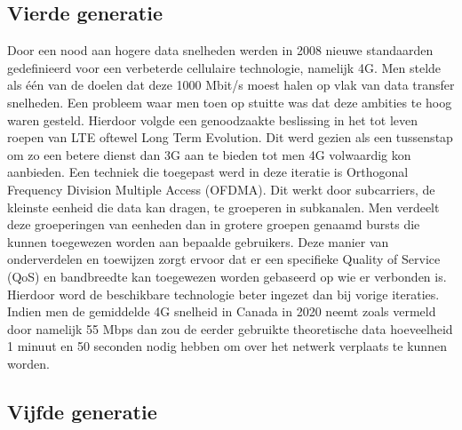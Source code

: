 \subsection{Vierde generatie}

Door een nood aan hogere data snelheden werden in 2008 nieuwe standaarden gedefinieerd voor een verbeterde cellulaire technologie, namelijk 4G. Men stelde als één van de doelen dat deze 1000 Mbit/s moest halen op vlak van data transfer snelheden. Een probleem waar men toen op stuitte was dat deze ambities te hoog waren gesteld. Hierdoor volgde een genoodzaakte beslissing in het tot leven roepen van LTE oftewel Long Term Evolution. Dit werd gezien als een tussenstap om zo een betere dienst dan 3G aan te bieden tot men 4G volwaardig kon aanbieden. \autocite{Nicholls2022} Een techniek die toegepast werd in deze iteratie is Orthogonal Frequency Division Multiple Access (OFDMA). Dit werkt door subcarriers, de kleinste eenheid die data kan dragen,  te groeperen in subkanalen. Men verdeelt deze groeperingen van eenheden dan in grotere groepen genaamd bursts die kunnen toegewezen worden aan bepaalde gebruikers. Deze manier van onderverdelen en toewijzen zorgt ervoor dat er een specifieke Quality of Service (QoS) en bandbreedte kan toegewezen worden gebaseerd op wie er verbonden is. Hierdoor word de beschikbare technologie beter ingezet dan bij vorige iteraties. \autocite{Friedmann2007} Indien men de gemiddelde 4G snelheid in Canada in 2020 neemt zoals vermeld door \textcite{Galazzo2020} namelijk 55 Mbps dan zou de eerder gebruikte theoretische data hoeveelheid 1 minuut en 50 seconden nodig hebben om over het netwerk verplaats te kunnen worden. \autocite{Wooding2024}

\subsection{Vijfde generatie}

